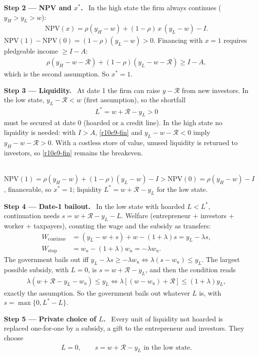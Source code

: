 \documentclass[11pt,a4paper]{article}
\newcommand{\step}[2]{\par\medskip\noindent\textbf{Step #1 --- #2.}~}
\newcommand{\answer}[1]{\par\smallskip\noindent\fbox{\textbf{Answer\if\relax\detokenize{#1}\relax\else\ #1\fi.}}~}
\newcommand{\Rc}{\mathcal{R}}
\begin{document}
\step{2}{NPV and $x^*$} In the high state the firm always continues ($y_H>y_L>w$):
\begin{align}
  \text{NPV}(x) = \rho(y_H-w)+(1-\rho)\,x\,(y_L-w)-I. \label{r10e9-npv}
\end{align}
$\text{NPV}(1)-\text{NPV}(0)=(1-\rho)(y_L-w)>0$. Financing with $x=1$ requires pledgeable income $\geq I-A$:
\begin{align}
  \rho(y_H-w-\Rc)+(1-\rho)(y_L-w-\Rc)\geq I-A, \label{r10e9-fin}
\end{align}
which is the second assumption. So $x^*=1$.

\step{3}{Liquidity} At date 1 the firm can raise $y-\Rc$ from new investors. In the low state, $y_L-\Rc<w$ (first assumption), so the shortfall
\begin{align}
  L^* = w+\Rc-y_L>0 \label{r10e9-L}
\end{align}
must be secured at date 0 (hoarded or a credit line). In the high state no liquidity is needed: with $I>A$, \eqref{r10e9-fin} and $y_L-w-\Rc<0$ imply $y_H-w-\Rc>0$. With a costless store of value, unused liquidity is returned to investors, so \eqref{r10e9-fin} remains the breakeven.

\answer{(i)} $\text{NPV}(1)=\rho(y_H-w)+(1-\rho)(y_L-w)-I>\text{NPV}(0)=\rho(y_H-w)-I$, financeable, so $x^*=1$; liquidity $L^*=w+\Rc-y_L$ for the low state.

\step{4}{Date-1 bailout} In the low state with hoarded $L<L^*$, continuation needs $s=w+\Rc-y_L-L$. Welfare (entrepreneur + investors + worker + taxpayers), counting the wage and the subsidy as transfers:
\begin{align}
  W_{\text{continue}} &= (y_L-w+s)+w-(1+\lambda)s = y_L-\lambda s, \label{r10e9-Wc}\\
  W_{\text{stop}} &= w_u-(1+\lambda)w_u = -\lambda w_u. \label{r10e9-Ws}
\end{align}
The government bails out iff $y_L-\lambda s\geq-\lambda w_u\iff\lambda(s-w_u)\leq y_L$. The largest possible subsidy, with $L=0$, is $s=w+\Rc-y_L$, and then the condition reads
\begin{align}
  \lambda(w+\Rc-y_L-w_u)\leq y_L \iff \lambda[(w-w_u)+\Rc]\leq(1+\lambda)y_L, \label{r10e9-bail}
\end{align}
exactly the assumption. So the government bails out whatever $L$ is, with $s=\max\{0,L^*-L\}$.

\step{5}{Private choice of $L$} Every unit of liquidity not hoarded is replaced one-for-one by a subsidy, a gift to the entrepreneur and investors. They choose
\begin{align}
  L = 0, \qquad s = w+\Rc-y_L \text{ in the low state}. \label{r10e9-L0}
\end{align}
\end{document}
